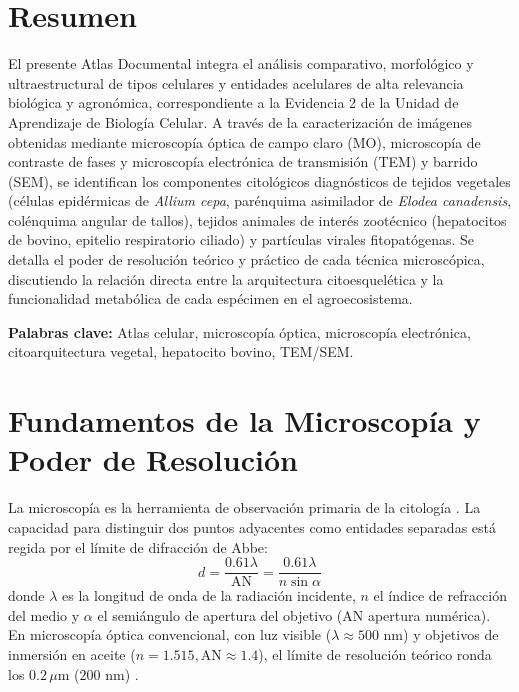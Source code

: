 \documentclass[spanish,letterpaper,oneside]{article}
\begin{document}
\hypersetup{pageanchor=false}
\begingroup
\fontsize{14}{17}\selectfont
\renewcommand{\Huge}{\fontsize{14}{17}\selectfont\bfseries}
\renewcommand{\large}{\fontsize{14}{17}\selectfont}
\templatePortrait
\clearpage
\endgroup
\hypersetup{pageanchor=true}
\templatePagecfg
\singlespacing
\setlength{\tabcolsep}{8pt}
\renewcommand{\arraystretch}{1.18}

\section*{Resumen}
El presente Atlas Documental integra el análisis comparativo, morfológico y ultraestructural de tipos celulares y entidades acelulares de alta relevancia biológica y agronómica, correspondiente a la Evidencia 2 de la Unidad de Aprendizaje de Biología Celular. A través de la caracterización de imágenes obtenidas mediante microscopía óptica de campo claro (MO), microscopía de contraste de fases y microscopía electrónica de transmisión (TEM) y barrido (SEM), se identifican los componentes citológicos diagnósticos de tejidos vegetales (células epidérmicas de \textit{Allium cepa}, parénquima asimilador de \textit{Elodea canadensis}, colénquima angular de tallos), tejidos animales de interés zootécnico (hepatocitos de bovino, epitelio respiratorio ciliado) y partículas virales fitopatógenas. Se detalla el poder de resolución teórico y práctico de cada técnica microscópica, discutiendo la relación directa entre la arquitectura citoesquelética y la funcionalidad metabólica de cada espécimen en el agroecosistema.

\vspace{0.4cm}
\noindent\textbf{Palabras clave:} Atlas celular, microscopía óptica, microscopía electrónica, citoarquitectura vegetal, hepatocito bovino, TEM/SEM.

\section{Fundamentos de la Microscopía y Poder de Resolución}
La microscopía es la herramienta de observación primaria de la citología \parencite{alberts2015}. La capacidad para distinguir dos puntos adyacentes como entidades separadas está regida por el límite de difracción de Abbe:
\begin{equation}
    d = \frac{0.61 \lambda}{\text{AN}} = \frac{0.61 \lambda}{n \sin \alpha}
\end{equation}
donde $\lambda$ es la longitud de onda de la radiación incidente, $n$ el índice de refracción del medio y $\alpha$ el semiángulo de apertura del objetivo ($\text{AN}$ apertura numérica). En microscopía óptica convencional, con luz visible ($\lambda \approx 500\text{ nm}$) y objetivos de inmersión en aceite ($n = 1.515, \text{AN} \approx 1.4$), el límite de resolución teórico ronda los $0.2\,\mu\text{m}$ ($200\text{ nm}$) \parencite{karp2014}.
\end{document}
